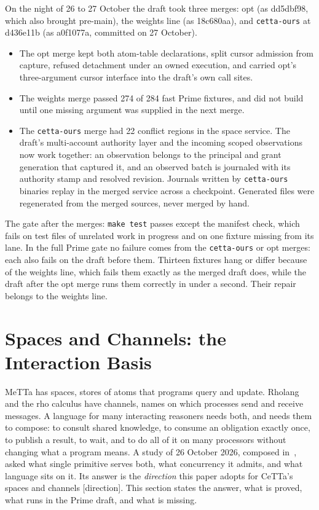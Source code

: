 \documentclass[11pt]{article}
\newcommand{\code}[1]{\texttt{#1}}
\newcommand{\kind}[1]{\textsf{\small[#1]}}
\newcommand{\CeTTa}{\textup{CeTTa}}
\begin{document}
On the night of 26 to 27 October the draft took three merges: opt (as
dd5dbf98, which also brought pre-main), the weights line (as 18c680aa), and
\code{cetta-ours} at d436e11b (as a0f1077a, committed on 27 October).

\begin{itemize}
\item The opt merge kept both atom-table declarations, split cursor admission
  from capture, refused detachment under an owned execution, and carried
  opt's three-argument cursor interface into the draft's own call sites.
\item The weights merge passed 274 of 284 fast Prime fixtures, and did not
  build until one missing argument was supplied in the next merge.
\item The \code{cetta-ours} merge had 22 conflict regions in the space
  service.  The draft's multi-account authority layer and the incoming scoped
  observations now work together: an observation belongs to the principal and
  grant generation that captured it, and an observed batch is journaled with
  its authority stamp and resolved revision.  Journals written by
  \code{cetta-ours} binaries replay in the merged service across a checkpoint.
  Generated files were regenerated from the merged sources, never merged by
  hand.
\end{itemize}

\noindent
The gate after the merges: \code{make test} passes except the manifest check,
which fails on test files of unrelated work in progress and on one fixture
missing from its lane.  In the full Prime gate no failure comes from the
\code{cetta-ours} or opt merges: each also fails on the draft before them.
Thirteen fixtures hang or differ because of the weights line, which fails them
exactly as the merged draft does, while the draft after the opt merge runs
them correctly in under a second.  Their repair belongs to the weights line.

\section{Spaces and Channels: the Interaction Basis}
\label{sec:interaction}

MeTTa has spaces, stores of atoms that programs query and update.  Rholang and
the rho calculus have channels, names on which processes send and receive
messages.  A language for many interacting reasoners needs both, and needs
them to compose: to consult shared knowledge, to consume an obligation exactly
once, to publish a result, to wait, and to do all of it on many processors
without changing what a program means.  A study of 26 October 2026, composed
in~\cite{interaction-basis}, asked what single primitive serves both, what
concurrency it admits, and what language sits on it.  Its answer is the
\emph{direction} this paper adopts for \CeTTa{}'s spaces and channels
\kind{direction}.  This section states the answer, what is proved, what runs
in the Prime draft, and what is missing.
\end{document}
